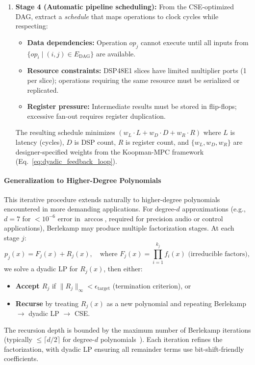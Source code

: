 \begin{enumerate}
    \item \textbf{Stage 4 (Automatic pipeline scheduling):} From the CSE-optimized DAG, extract a \emph{schedule} that maps operations to clock cycles while respecting:
    \begin{itemize}
        \item \textbf{Data dependencies:} Operation $op_j$ cannot execute until all inputs from $\{op_i \mid (i,j) \in E_{\text{DAG}}\}$ are available.
        \item \textbf{Resource constraints:} DSP48E1 slices have limited multiplier ports (1 per slice); operations requiring the same resource must be serialized or replicated.
        \item \textbf{Register pressure:} Intermediate results must be stored in flip-flops; excessive fan-out requires register duplication.
    \end{itemize}
    The resulting schedule minimizes $(w_L \cdot L + w_D \cdot D + w_R \cdot R)$ where $L$ is latency (cycles), $D$ is DSP count, $R$ is register count, and $\{w_L, w_D, w_R\}$ are designer-specified weights from the Koopman-MPC framework (Eq.~\eqref{eq:dyadic_feedback_loop}).
\end{enumerate}

\paragraph{Generalization to Higher-Degree Polynomials}

This iterative procedure extends naturally to higher-degree polynomials encountered in more demanding applications. For degree-$d$ approximations (e.g., $d=7$ for $<10^{-6}$ error in $\arccos$, required for precision audio or control applications), Berlekamp may produce multiple factorization stages. At each stage $j$:
\[
p_j(x) = F_j(x) + R_j(x), \quad \text{where } F_j(x) = \prod_{i=1}^{k_j} f_i(x) \text{ (irreducible factors)},
\]
we solve a dyadic LP for $R_j(x)$, then either:
\begin{itemize}
    \item \textbf{Accept $R_j$} if $\|R_j\|_\infty < \epsilon_{\text{target}}$ (termination criterion), or
    \item \textbf{Recurse} by treating $R_j(x)$ as a new polynomial and repeating Berlekamp $\to$ dyadic LP $\to$ CSE.
\end{itemize}

The recursion depth is bounded by the maximum number of Berlekamp iterations (typically $\leq \lceil d/2 \rceil$ for degree-$d$ polynomials~\cite{gathen2013modern}). Each iteration refines the factorization, with dyadic LP ensuring all remainder terms use bit-shift-friendly coefficients.

